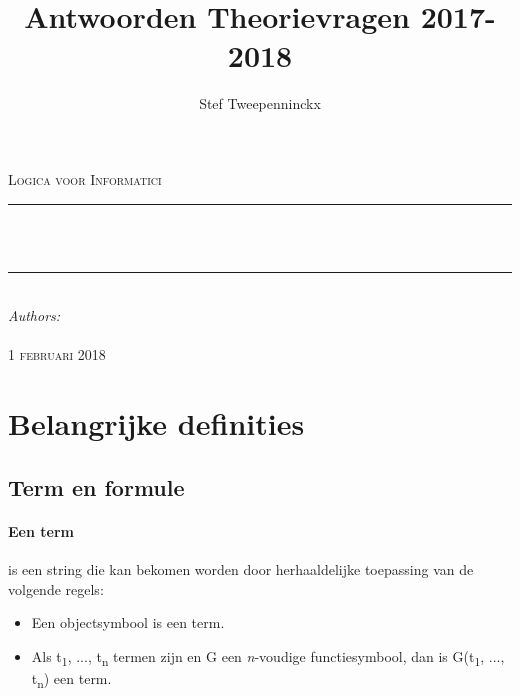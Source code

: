 \documentclass[11pt, a4paper]{article}
\author{Stef Tweepenninckx}
\title{Antwoorden Theorievragen 2017-2018}
\makeatletter
\def\printtitle{                 
    {\large \@title}}
\def\printauthor{                  
    {\large \@author}}
\makeatother
\begin{document}
\begin{titlepage}
\newcommand{\HRule}{\rule{\linewidth}{0.5mm}} 
\center 
\textsc{\LARGE Logica voor Informatici}\\[1.5cm] 
\HRule \\[0.4cm]

{\huge \bfseries \printtitle}\\[0.4cm] 
\HRule \\[0.4cm]

\Large \emph{Authors:}\\
 \textsc{\printauthor}\\[3cm]

{\large \textsc{1 februari 2018}}\\[3cm] 

\vfill 
\end{titlepage}
\tableofcontents
\newpage
{}
\section*{Belangrijke definities}
\subsection*{Term en formule}
\paragraph{Een term} is een string die kan bekomen worden door herhaaldelijke toepassing van de volgende regels: \begin{itemize}
\item Een objectsymbool is een term.
\item Als t\textsubscript{1}, ..., t\textsubscript{n} termen zijn en G een \textit{n}-voudige functiesymbool, dan is G(t\textsubscript{1}, ..., t\textsubscript{n}) een term.
\end{itemize}
\end{document}
